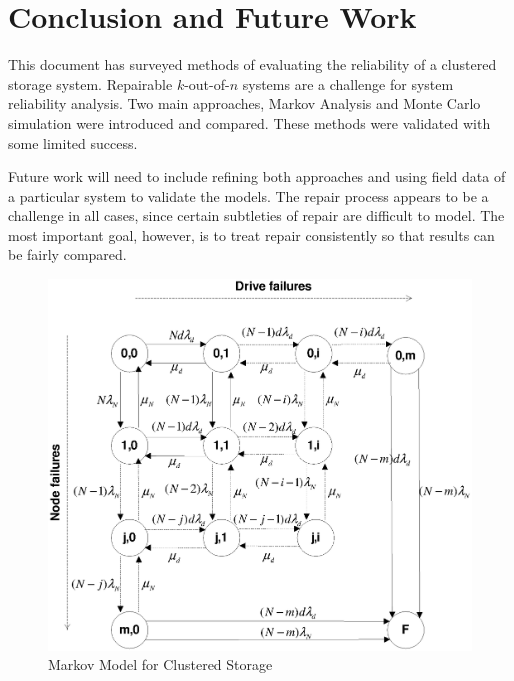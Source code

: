 \documentclass[11pt]{article}
\numberwithin{equation}{section}
\begin{document}
\section{Conclusion and Future Work}

This document has surveyed methods of evaluating the reliability of a
clustered storage system.  Repairable $k$-out-of-$n$ systems are a challenge
for system reliability analysis. Two main approaches, Markov Analysis and
Monte Carlo simulation were introduced and compared.  These methods were
validated with some limited success.  

Future work will need to include refining both approaches and using field data
of a particular system to validate the models.  The repair process appears to
be a challenge in all cases, since certain subtleties of repair are difficult
to model.  The most important goal, however, is to treat repair consistently
so that results can be fairly compared.

\begin{figure}[h]
\begin{center}
\includegraphics[width=\textwidth]{ClusterMarkov}
\end{center}
\caption{Markov Model for Clustered Storage}
\label{fig-markov-cluster}
\end{figure}
\end{document}
